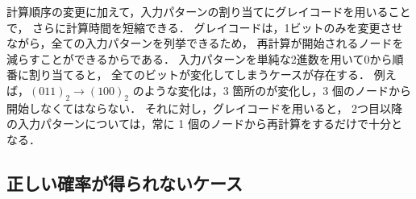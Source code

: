 計算順序の変更に加えて，入力パターンの割り当てにグレイコードを用いることで，
さらに計算時間を短縮できる．
グレイコードは，1ビットのみを変更させながら，全ての入力パターンを列挙できるため，
再計算が開始されるノードを減らすことができるからである．
入力パターンを単純な2進数を用いて0から順番に割り当てると，
全てのビットが変化してしまうケースが存在する．
例えば，$(011)_2 \to (100)_2$ のような変化は，3 箇所のが変化し，3 個のノードから開始しなくてはならない．
それに対し，グレイコードを用いると，
2つ目以降の入力パターンについては，常に 1 個のノードから再計算をするだけで十分となる．

\subsection{正しい確率が得られないケース}


